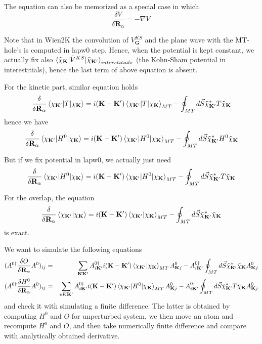 \documentclass[aps,prb,floatfix,epsfig,singlecolumn,showpacs,preprintnumbers]{revtex4}
\newcommand{\vR}{{\mathbf{R}}}
\newcommand{\vK}{{\mathbf{K}}}
\newcommand{\vG}{{\mathbf{G}}}
\begin{document}
The equation can also be memorized as a special case in which 
$$\frac{\delta V}{\delta \vR_\alpha} = -\nabla V.$$

Note that in Wien2K the convolution of $V^{KS}_{\vG}$ and the plane
wave with the MT-hole's is computed in lapw0 step. Hence, when the
potential is kept constant, we actually fix also
$\braket{\tilde{\chi}_{\vK}|\tilde{V}^{KS}|\tilde{\chi}_{\vK'}}_{interstitials}$ (the
Kohn-Sham potential in interestitials), hence the last term of above
equation is absent.

For the kinetic part, similar equation holds
\begin{eqnarray}
\frac{\delta}{\delta \vR_\alpha} \braket{\chi_{\vK'}|T|\chi_{\vK}} = 
i(\vK-\vK')\braket{\chi_{\vK'}|T|\chi_\vK}_{MT} 
-\oint_{MT} d\vec{S} \tilde{\chi}_{\vK'}^* T  \tilde{\chi}_{\vK}
\end{eqnarray}
hence we have
\begin{eqnarray}
\frac{\delta}{\delta \vR_\alpha} \braket{\chi_{\vK'}|H^0|\chi_{\vK}} = 
i(\vK-\vK')\braket{\chi_{\vK'}|H^0|\chi_\vK}_{MT} 
-\oint_{MT} d\vec{S} \tilde{\chi}_{\vK'}^* H^0  \tilde{\chi}_{\vK}
\end{eqnarray}

But if we fix potential in lapw0, we actually just need 
\begin{eqnarray}
\frac{\delta}{\delta \vR_\alpha} \braket{\chi_{\vK'}|H^0|\chi_{\vK}} = 
i(\vK-\vK')\braket{\chi_{\vK'}|H^0|\chi_\vK}_{MT} 
-\oint_{MT} d\vec{S} \tilde{\chi}_{\vK'}^* T  \tilde{\chi}_{\vK}
\end{eqnarray}

For the overlap, the equation 
\begin{eqnarray}
\frac{\delta}{\delta \vR_\alpha} \braket{\chi_{\vK'}|\chi_{\vK}} = 
i(\vK-\vK')\braket{\chi_{\vK'}|\chi_\vK}_{MT} 
-\oint_{MT} d\vec{S} \tilde{\chi}_{\vK'}^* \tilde{\chi}_{\vK}
\end{eqnarray}
is exact.

We want to simulate the following equations
\begin{eqnarray}
(A^{0\dagger}\frac{\delta O}{\delta \vR_\alpha}  A^0)_{ij}&=&
\sum_{\vK\vK'}A^{0\dagger}_{i\vK'}i(\vK-\vK')\braket{\chi_{\vK'}|\chi_\vK}_{MT} A^0_{\vK j}
-A^{0\dagger}_{i\vK'}\oint_{MT} d\vec{S} \tilde{\chi}_{\vK'}^* \tilde{\chi}_{\vK}A^0_{\vK j}\\
 (A^{0\dagger}\frac{\delta H^0}{\delta \vR_\alpha}  A^0)_{ij}&=& 
\sum_{vK\vK'}A^{0\dagger}_{i\vK'}i(\vK-\vK')\braket{\chi_{\vK'}|H^0|\chi_\vK}_{MT}  A^0_{\vK j}
-A^{0\dagger}_{i\vK'}\oint_{MT} d\vec{S} \tilde{\chi}_{\vK'}^* T  \tilde{\chi}_{\vK}A^0_{\vK j}
\end{eqnarray}
and check it with simulating a finite difference. The latter is
obtained by computing $H^0$ and $O$ for unperturbed system, we then
move an atom and recompute $H^0$ and $O$, and then take numerically
finite difference and compare with analytically obtained derivative.
\end{document}
